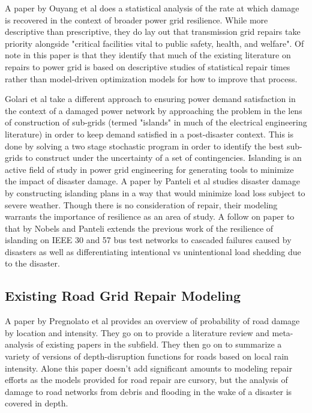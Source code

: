 \documentclass{article}
\begin{document}
		A paper by Ouyang et al\cite{OuyangEA2014} does a statistical analysis of the rate at which damage is recovered in the context of broader power grid resilience. While more descriptive than prescriptive, they do lay out that transmission grid repairs take priority alongside "critical facilities vital to public safety, health, and welfare". Of note in this paper is that they identify that much of the existing literature on repairs to power grid is based on descriptive studies of statistical repair times rather than model-driven optimization models for how to improve that process.
		
		Golari et al\cite{GolariEA2014} take a different approach to ensuring power demand satisfaction in the context of a damaged power network by approaching the problem in the lens of construction of sub-grids (termed "islands" in much of the electrical engineering literature) in order to keep demand satisfied in a post-disaster context. This is done by solving a two stage stochastic program in order to identify the best sub-grids to construct under the uncertainty of a set of contingencies. Islanding is an active field of study in power grid engineering for generating tools to minimize the impact of disaster damage. A paper by Panteli et al\cite{Panteli2016} studies disaster damage by constructing islanding plans in a way that would minimize load loss subject to severe weather. Though there is no consideration of repair, their modeling warrants the importance of resilience as an area of study.  A follow on paper to that by Nobels and Panteli \cite{NobelsEA2019} extends the previous work of the resilience of islanding on IEEE 30 and 57 bus test networks to cascaded failures caused by disasters as well as differentiating intentional vs unintentional load shedding due to the disaster.
	\subsection{Existing Road Grid Repair Modeling}
		A paper by Pregnolato et al\cite{PregnolatoEA2017} provides an overview of probability of road damage by location and intensity. They go on to provide a literature review and meta-analysis of existing papers in the subfield. They then go on to summarize a variety of versions of depth-disruption functions for roads based on local rain intensity. Alone this paper doesn't add significant amounts to modeling repair efforts as the models provided for road repair are cursory, but the analysis of damage to road networks from debris and flooding in the wake of a disaster is covered in depth.
		
\end{document}

